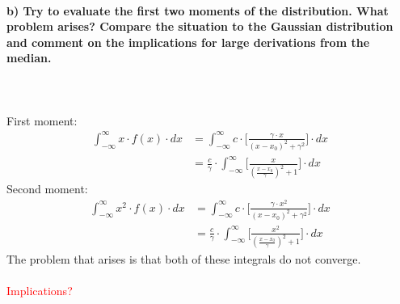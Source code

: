 \newpage
\paragraph{b) Try to evaluate the first two moments of the distribution.
    What problem arises? Compare the situation to the Gaussian 
    distribution and comment on the implications for large derivations
    from the median.
} \ \\
\\
    First moment:
    \begin{align}
        \int_{-\infty}^\infty x\cdot f(x)\cdot dx
        &=\int_{-\infty}^\infty c\cdot\bigg[
            \frac{\gamma\cdot x}{(x-x_0)^2+\gamma^2}
        \bigg]\cdot dx \\
        &=\frac{c}{\gamma}\cdot\int_{-\infty}^\infty\bigg[
            \frac{x}{(\frac{x-x_0}{\gamma})^2+1}
        \bigg]\cdot dx
    \end{align}
    Second moment:
    \begin{align}
        \int_{-\infty}^\infty x^2\cdot f(x)\cdot dx
        &=\int_{-\infty}^\infty c\cdot\bigg[
            \frac{\gamma\cdot x^2}{(x-x_0)^2+\gamma^2}
        \bigg]\cdot dx \\
        &=\frac{c}{\gamma}\cdot\int_{-\infty}^\infty\bigg[
            \frac{x^2}{(\frac{x-x_0}{\gamma})^2+1}
        \bigg]\cdot dx
    \end{align}
    The problem that arises is that both of these integrals do not converge. \\
    \\
    \textcolor{red}{Implications?}

